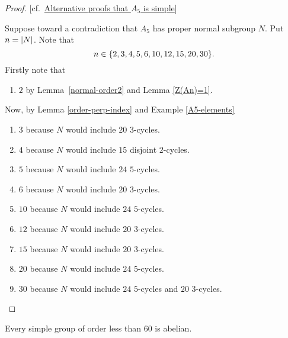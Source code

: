 \begin{proof} {[cf.~\href{https://math.stackexchange.com/a/329293/269050}{Alternative proofs that  $A_5$ is simple}]}

Suppose toward a contradiction that $A_5$ has proper normal subgroup $N$. Put $n=\left\vert{N}\right\vert$. Note that
$$
    n\in\{2, 3, 4, 5, 6, 10, 12, 15, 20, 30\}.
$$
Firstly note that
\begin{enumerate}[$n\ne$]
    \item $2$ by Lemma~\ref{normal-order2} and Lemma \ref{Z(An)=1}.
\end{enumerate}
Now, by Lemma \ref{order-perp-index} and Example \ref{A5-elements}
\begin{enumerate}[$n\ne$]
    \item $3$ because $N$ would include $20$ $3$-cycles.
    \item $4$ because $N$ would include $15$ disjoint $2$-cycles.
    \item $5$ because $N$ would include $24$ $5$-cycles.
    \item $6$ because $N$ would include $20$ $3$-cycles.
    \item $10$ because $N$ would include $24$ $5$-cycles.
    \item $12$ because $N$ would include $20$ $3$-cycles.
    \item $15$ because $N$ would include $20$ $3$-cycles.
    \item $20$ because $N$ would include $24$ $5$-cycles.
    \item $30$ because $N$ would include $24$ $5$-cycles and $20$ $3$-cycles.
\end{enumerate}
 \end{proof}

\begin{prop}
    Every simple group of order less than\/ $60$ is abelian.
\end{prop}

